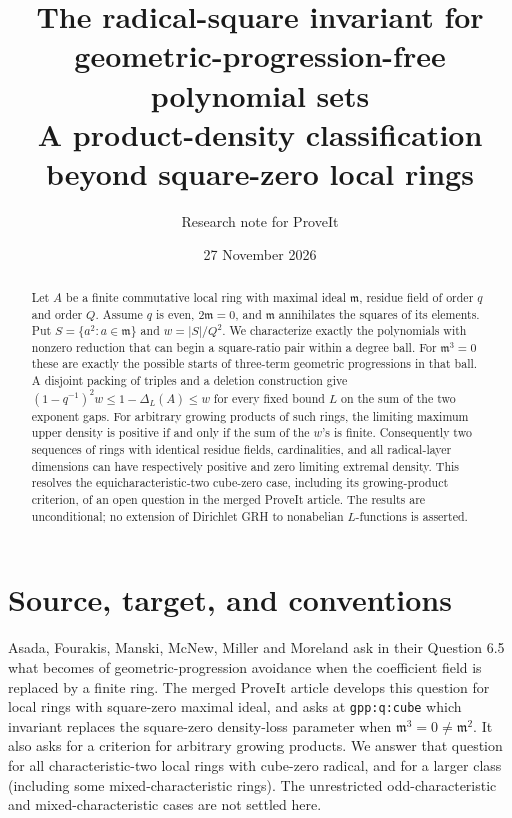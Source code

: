 \documentclass[11pt]{article}
\title{The radical-square invariant for geometric-progression-free polynomial sets\\\large A product-density classification beyond square-zero local rings}
\author{Research note for ProveIt}
\date{27 November 2026}
\theoremstyle{remark}\newtheorem{remark}[theorem]{Remark}
\newcommand{\m}{\mathfrak m}
\begin{document}
\maketitle
\begin{abstract}
Let $A$ be a finite commutative local ring with maximal ideal $\m$, residue field of order $q$ and order $Q$. Assume $q$ is even, $2\m=0$, and $\m$ annihilates the squares of its elements. Put $S=\{a^2:a\in\m\}$ and $w=|S|/Q^2$. We characterize exactly the polynomials with nonzero reduction that can begin a square-ratio pair within a degree ball. For $\m^3=0$ these are exactly the possible starts of three-term geometric progressions in that ball. A disjoint packing of triples and a deletion construction give $(1-q^{-1})^2w\le 1-\Delta_L(A)\le w$ for every fixed bound $L$ on the sum of the two exponent gaps. For arbitrary growing products of such rings, the limiting maximum upper density is positive if and only if the sum of the $w$'s is finite. Consequently two sequences of rings with identical residue fields, cardinalities, and all radical-layer dimensions can have respectively positive and zero limiting extremal density. This resolves the equicharacteristic-two cube-zero case, including its growing-product criterion, of an open question in the merged ProveIt article. The results are unconditional; no extension of Dirichlet GRH to nonabelian $L$-functions is asserted.
\end{abstract}

\section{Source, target, and conventions}
Asada, Fourakis, Manski, McNew, Miller and Moreland \cite{asada} ask in their Question 6.5 what becomes of geometric-progression avoidance when the coefficient field is replaced by a finite ring. The merged ProveIt article \cite{proveit} develops this question for local rings with square-zero maximal ideal, and asks at \texttt{gpp:q:cube} which invariant replaces the square-zero density-loss parameter when $\m^3=0\ne\m^2$. It also asks for a criterion for arbitrary growing products. We answer that question for all characteristic-two local rings with cube-zero radical, and for a larger class (including some mixed-characteristic rings). The unrestricted odd-characteristic and mixed-characteristic cases are not settled here.
\end{document}
